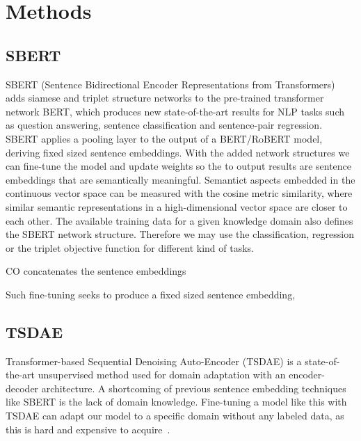\documentclass[fleqn,moreauthors,10pt]{ds_report}
\begin{document}
\section*{Methods}

\subsection*{SBERT}
SBERT (Sentence Bidirectional Encoder Representations from Transformers) adds siamese and triplet structure networks to the pre-trained transformer network BERT, which produces new state-of-the-art results for NLP tasks such as question answering, sentence classification and sentence-pair regression. SBERT applies a pooling layer to the output of a BERT/RoBERT model, deriving fixed sized sentence embeddings. With the added network structures we can fine-tune the model and update weights so the to output results are sentence embeddings that are semantically meaningful. Semantict aspects embedded in the continuous vector space can be measured with the cosine metric similarity, where similar semantic representations in a high-dimensional vector space are closer to each other. The available training data for a given knowledge domain also defines the SBERT network structure. Therefore we may use the classification, regression or the triplet objective function for different kind of tasks.

CO concatenates the sentence embeddings 

Such fine-tuning seeks to produce a fixed sized sentence embedding, 

\subsection*{TSDAE}

Transformer-based Sequential Denoising Auto-Encoder (TSDAE) is a state-of-the-art unsupervised method used for domain adaptation with an encoder-decoder architecture. A shortcoming of previous sentence embedding techniques like SBERT is the lack of domain knowledge. Fine-tuning a model like this with TSDAE can adapt our model to a specific domain without any labeled data, as this is hard and expensive to acquire~\cite{wang-etal-2021-tsdae-using}. 
\end{document}
